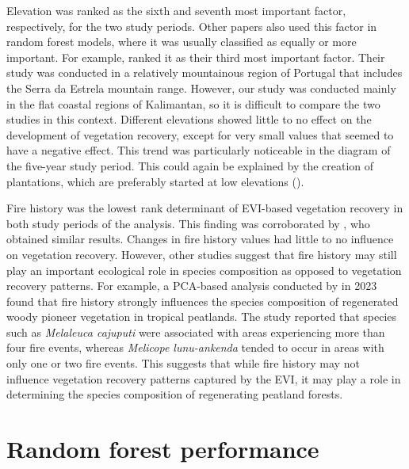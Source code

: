 \documentclass[
  fontsize=12pt,
  paper=a4,
  parskip=half,
  headings=big,
  DIV=12
]{scrreprt}
\begin{document}
Elevation was ranked as the sixth and seventh most important factor, respectively, for the two study periods. Other papers also used this factor in random forest models, where it was usually classified as equally or more important. For example, \textcite{joao_indicator-based_2018} ranked it as their third most important factor. Their study was conducted in a relatively mountainous region of Portugal that includes the Serra da Estrela mountain range. However, our study was conducted mainly in the flat coastal regions of Kalimantan, so it is difficult to compare the two studies in this context.
Different elevations showed little to no effect on the development of vegetation recovery, except for very small values that seemed to have a negative effect. This trend was particularly noticeable in the diagram of the five-year study period. This could again be explained by the creation of plantations, which are preferably started at low elevations (\cite{harris_projections_2010}).

Fire history was the lowest rank determinant of EVI-based vegetation recovery in both study periods of the analysis. This finding was corroborated by \textcite{joao_indicator-based_2018}, who obtained similar results. Changes in fire history values had little to no influence on vegetation recovery.
However, other studies suggest that fire history may still play an important ecological role in species composition as opposed to vegetation recovery patterns.
For example, a PCA-based analysis conducted by \textcite{giesen_roles_2023} in 2023 found that fire history strongly influences the species composition of regenerated woody pioneer vegetation in tropical peatlands. The study reported that species such as \textit{Melaleuca cajuputi} were associated with areas experiencing more than four fire events, whereas \textit{Melicope lunu-ankenda} tended to occur in areas with only one or two fire events.
This suggests that while fire history may not influence vegetation recovery patterns captured by the EVI, it may play a role in determining the species composition of regenerating peatland forests.


 \section{Random forest performance}
\end{document}
